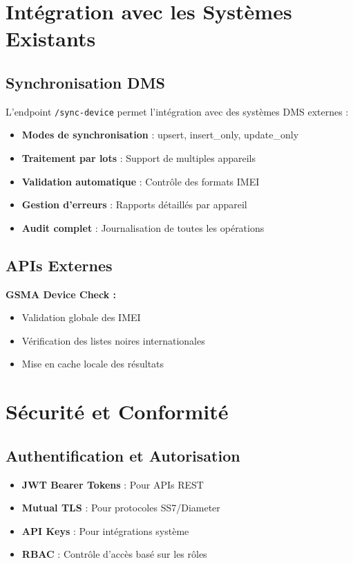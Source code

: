 \documentclass[11pt]{article}
\begin{document}
\section{Intégration avec les Systèmes Existants}

\subsection{Synchronisation DMS}

L'endpoint \texttt{/sync-device} permet l'intégration avec des systèmes DMS externes :

\begin{itemize}
    \item \textbf{Modes de synchronisation} : upsert, insert\_only, update\_only
    \item \textbf{Traitement par lots} : Support de multiples appareils
    \item \textbf{Validation automatique} : Contrôle des formats IMEI
    \item \textbf{Gestion d'erreurs} : Rapports détaillés par appareil
    \item \textbf{Audit complet} : Journalisation de toutes les opérations
\end{itemize}

\subsection{APIs Externes}

\textbf{GSMA Device Check :}
\begin{itemize}
    \item Validation globale des IMEI
    \item Vérification des listes noires internationales
    \item Mise en cache locale des résultats
\end{itemize}

\section{Sécurité et Conformité}

\subsection{Authentification et Autorisation}

\begin{itemize}
    \item \textbf{JWT Bearer Tokens} : Pour APIs REST
    \item \textbf{Mutual TLS} : Pour protocoles SS7/Diameter
    \item \textbf{API Keys} : Pour intégrations système
    \item \textbf{RBAC} : Contrôle d'accès basé sur les rôles
\end{itemize}
\end{document}
